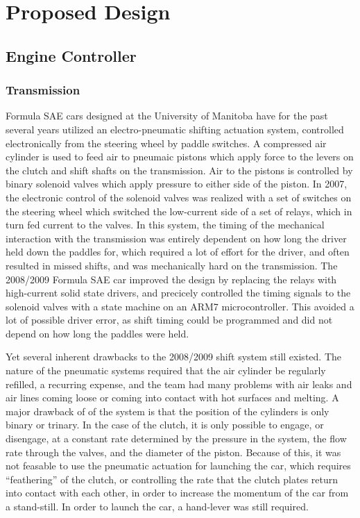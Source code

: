 %
%
%
%

\section{Proposed Design}

%
%
\subsection{Engine Controller}

\subsubsection{Transmission}

Formula SAE cars designed at the University of Manitoba have for the past several years utilized an electro-pneumatic shifting actuation system, controlled electronically from the steering wheel by paddle switches. A compressed air cylinder is used to feed air to pneumaic pistons which apply force to the levers on the clutch and shift shafts on the transmission. Air to the pistons is controlled by binary solenoid valves which apply pressure to either side of the piston. In 2007, the electronic control of the solenoid valves was realized with a set of switches on the steering wheel which switched the low-current side of a set of relays, which in turn fed current to the valves. In this system, the timing of the mechanical interaction with the transmission was entirely dependent on how long the driver held down the paddles for, which required a lot of effort for the driver, and often resulted in missed shifts, and was mechanically hard on the transmission. The 2008/2009 Formula SAE car improved the design by replacing the relays with high-current solid state drivers, and precicely controlled the timing signals to the solenoid valves with a state machine on an ARM7 microcontroller. This avoided a lot of possible driver error, as shift timing could be programmed and did not depend on how long the paddles were held.

Yet several inherent drawbacks to the 2008/2009 shift system still existed. The nature of the pneumatic systems required that the air cylinder be regularly refilled, a recurring expense, and the team had many problems with air leaks and air lines coming loose or coming into contact with hot surfaces and melting. A major drawback of of the system is that the position of the cylinders is only binary or trinary. In the case of the clutch, it is only possible to engage, or disengage, at a constant rate determined by the pressure in the system, the flow rate through the valves, and the diameter of the piston. Because of this, it was not feasable to use the pneumatic actuation for launching the car, which requires {}``feathering'' of the clutch, or controlling the rate that the clutch plates return into contact with each other, in order to increase the momentum of the car from a stand-still. In order to launch the car, a hand-lever was still required.

